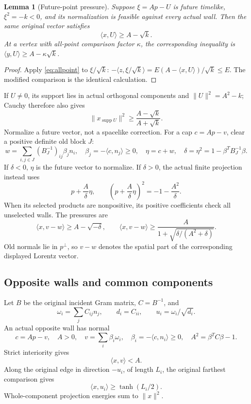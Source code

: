\documentclass[11pt]{article}
\newtheorem{lemma}[theorem]{Lemma}
\theoremstyle{definition}
\theoremstyle{remark}
\newcommand{\ip}[2]{\langle #1,#2\rangle}
\newcommand{\norm}[1]{\lVert #1\rVert}
\begin{document}
\begin{lemma}[Future-point pressure]
\label{lem:pointpressure}
Suppose \(\xi=A p-U\) is future timelike, \(\xi^2=-k<0\),
and its normalization is feasible against every actual wall.
Then the same original vector satisfies
\[
 \ip{x}{U}\geq A-\sqrt{k}.
\]
At a vertex with all-point comparison factor \(\kappa\), the
corresponding inequality is \(\ip{y}{U}\geq A-\kappa\sqrt{k}\).
\end{lemma}
\begin{proof}
Apply \eqref{eq:allpoint} to \(\xi/\sqrt{k}\):
\(-\ip{z}{\xi/\sqrt{k}}=E(A-\ip{x}{U})/\sqrt{k}\leq E\).
The modified comparison is the identical calculation.
\end{proof}
If \(U\ne0\), its support lies in actual orthogonal components
and \(\norm{U}^2=A^2-k\); Cauchy therefore also gives
\begin{equation}\label{eq:pointenergy}
 \norm{x_{\operatorname{supp}U}}^2
 \geq\frac{A-\sqrt{k}}{A+\sqrt{k}}.
\end{equation}
Normalize a future vector, not a spacelike correction.
For a cap \(c=A p-v\), clear a positive definite old block \(J\):
\[
 w=\sum_{i,j\in J}(B_J^{-1})_{ij}\beta_j n_i,\quad
 \beta_j=-\ip{c}{n_j}\geq0,\quad
 \eta=c+w,\quad \delta=\eta^2=1-\beta^TB_J^{-1}\beta.
\]
If \(\delta<0\), \(\eta\) is the future vector to normalize.
If \(\delta>0\), the actual finite projection instead uses
\[
 p+\frac{A}{\delta}\eta,\qquad
 \left(p+\frac{A}{\delta}\eta\right)^2=-1-\frac{A^2}{\delta}.
\]
When its selected products are nonpositive, its positive
coefficients check all unselected walls. The pressures are
\begin{equation}
\label{eq:corepressure}
 \ip{x}{v-w}\geq A-\sqrt{-\delta},\qquad
 \ip{x}{v-w}\geq
 \frac{A}{1+\sqrt{\delta/(A^2+\delta)}}.
\end{equation}
Old normals lie in \(p^\perp\), so \(v-w\) denotes the spatial
part of the corresponding displayed Lorentz vector.

\subsection{Opposite walls and common components}
Let \(B\) be the original incident Gram matrix, \(C=B^{-1}\), and
\[
 \omega_i=\sum_j C_{ij}n_j,\qquad
 d_i=C_{ii},\qquad u_i=\omega_i/\sqrt{d_i}.
\]
An actual opposite wall has normal
\[
 c=A p-v,\quad A>0,\quad
 v=\sum_i\beta_i\omega_i,\quad \beta_i=-\ip{c}{n_i}\geq0,\quad
 A^2=\beta^TC\beta-1.
\]
Strict interiority gives
\begin{equation}\label{eq:actualinterior}
 \ip{x}{v}<A.
\end{equation}
Along the original edge in direction \(-u_i\), of length \(L_i\),
the original farthest comparison gives
\begin{equation}
\label{eq:halfheight}
 \ip{x}{u_i}\geq\tanh(L_i/2).
\end{equation}
Whole-component projection energies sum to \(\norm{x}^2\).
\end{document}
